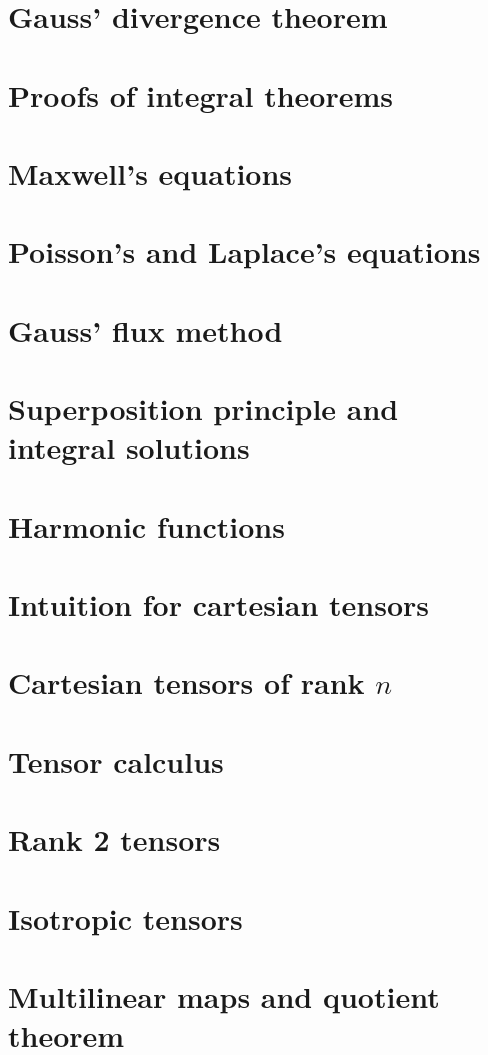 \documentclass{article}
\begin{document}
\section{Gauss' divergence theorem}

\section{Proofs of integral theorems}

\section{Maxwell's equations}

\section{Poisson's and Laplace's equations}

\section{Gauss' flux method}

\section{Superposition principle and integral solutions}

\section{Harmonic functions}

\section{Intuition for cartesian tensors}

\section{Cartesian tensors of rank \(n\)}

\section{Tensor calculus}

\section{Rank 2 tensors}

\section{Isotropic tensors}

\section{Multilinear maps and quotient theorem}

\end{document}
